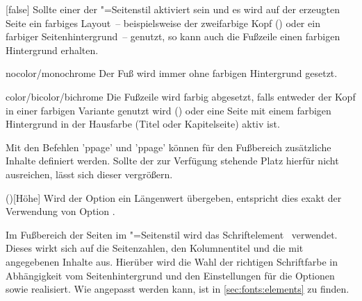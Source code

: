 \begin{Declaration*}{}
\begin{Declaration*}{}
\begin{Declaration*}{}
\begin{Declaration}[%
  v2.03!\Option{cdfoot=color}:farbiger Hintergrund der Fußzeile;%
  v2.03!\Option{cdfoot=\PValueName{Höhe}};%
]{}[false]
Sollte einer der "=Seitenstil aktiviert sein und es wird 
auf der erzeugten Seite ein farbiges Layout~--  beispielsweise der zweifarbige 
Kopf () oder ein farbiger Seitenhintergrund~-- genutzt, 
so kann auch die Fußzeile einen farbigen Hintergrund erhalten.
%
\begin{values}{}
\item[nocolor/monochrome]
  Der Fuß wird immer ohne farbigen Hintergrund gesetzt.
\item[color/bicolor/bichrome]
  Die Fußzeile wird farbig abgesetzt, falls entweder der Kopf in einer farbigen
  Variante genutzt wird () oder eine Seite mit einem 
  farbigen Hintergrund in der Hausfarbe (Titel oder Kapitelseite) aktiv ist.
\end{values}
%
Mit den Befehlen 'ppage' und 'ppage' können 
für den Fußbereich zusätzliche Inhalte definiert werden. Sollte der zur 
Verfügung stehende Platz hierfür nicht ausreichen, lässt sich dieser vergrößern.
%
\begin{values}{}
\item(\PValueName)[Höhe]
  Wird der Option ein Längenwert übergeben, entspricht dies exakt der 
  Verwendung von Option .
\end{values}
\end{Declaration}

\begin{Declaration}[v2.04]{}
\printdeclarationlist%
%
%
Im Fußbereich der Seiten im "=Seitenstil wird das 
Schriftelement~ verwendet. Dieses wirkt sich auf die 
Seitenzahlen, den Kolumnentitel und die mit  angegebenen 
Inhalte aus. Hierüber wird die Wahl der richtigen Schriftfarbe in Abhängigkeit 
vom Seitenhintergrund und den Einstellungen für die Optionen  
sowie  realisiert. Wie  angepasst werden 
kann, ist in \autoref{sec:fonts:elements} zu finden.
\end{Declaration}


\end{Declaration*}
\end{Declaration*}
\end{Declaration*}
